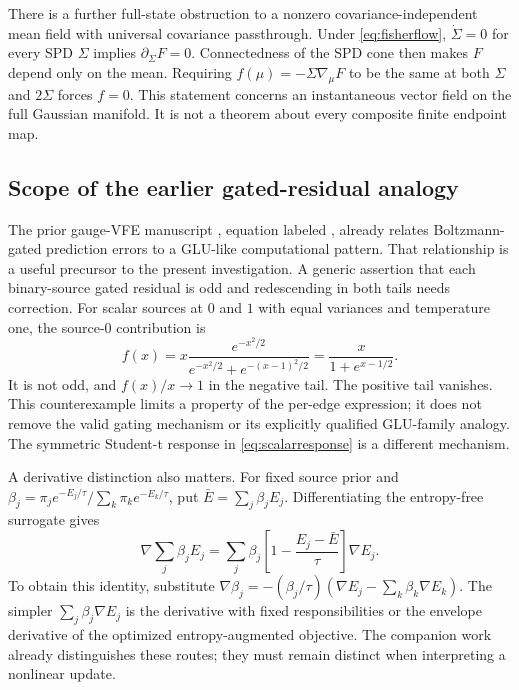 \documentclass[11pt]{article}
\begin{document}
There is a further full-state obstruction to a nonzero covariance-independent mean field with universal covariance passthrough. Under \eqref{eq:fisherflow}, $\dot\Sigma=0$ for every SPD $\Sigma$ implies $\partial_\Sigma F=0$. Connectedness of the SPD cone then makes $F$ depend only on the mean. Requiring $f(\mu)=-\Sigma\nabla_\mu F$ to be the same at both $\Sigma$ and $2\Sigma$ forces $f=0$. This statement concerns an instantaneous vector field on the full Gaussian manifold. It is not a theorem about every composite finite endpoint map.

\subsection{Scope of the earlier gated-residual analogy}

The prior gauge-VFE manuscript , equation labeled , already relates Boltzmann-gated prediction errors to a GLU-like computational pattern. That relationship is a useful precursor to the present investigation. A generic assertion that each binary-source gated residual is odd and redescending in both tails needs correction. For scalar sources at $0$ and $1$ with equal variances and temperature one, the source-$0$ contribution is
\begin{equation}
f(x)=x\frac{e^{-x^2/2}}{e^{-x^2/2}+e^{-(x-1)^2/2}}
=\frac{x}{1+e^{x-1/2}}.
\label{eq:gatecounter}
\end{equation}
It is not odd, and $f(x)/x\to1$ in the negative tail. The positive tail vanishes. This counterexample limits a property of the per-edge expression; it does not remove the valid gating mechanism or its explicitly qualified GLU-family analogy. The symmetric Student-t response in \eqref{eq:scalarresponse} is a different mechanism.

A derivative distinction also matters. For fixed source prior and $\beta_j=\pi_je^{-E_j/\tau}/\sum_k\pi_ke^{-E_k/\tau}$, put $\bar E=\sum_j\beta_jE_j$. Differentiating the entropy-free surrogate gives
\begin{equation}
\nabla\sum_j\beta_jE_j
=\sum_j\beta_j\left[1-\frac{E_j-\bar E}{\tau}\right]\nabla E_j.
\label{eq:surrogate}
\end{equation}
To obtain this identity, substitute $\nabla\beta_j=-(\beta_j/\tau)(\nabla E_j-\sum_k\beta_k\nabla E_k)$. The simpler $\sum_j\beta_j\nabla E_j$ is the derivative with fixed responsibilities or the envelope derivative of the optimized entropy-augmented objective. The companion work already distinguishes these routes; they must remain distinct when interpreting a nonlinear update.
\end{document}
